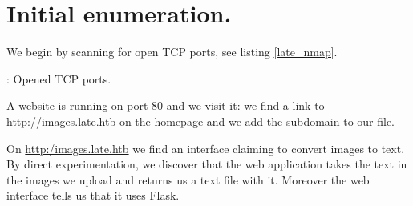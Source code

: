 \section{Initial enumeration.}
\par We begin by scanning  for open TCP ports, see listing \ref{late_nmap}.
\begin{listing}
  \tiny
	
	\caption{: Opened TCP ports.}
	\label{late_nmap}
\end{listing}
\par A website is running on port 80 and we visit it: we find a link to \url{http://images.late.htb} on the homepage and we add the subdomain to our  file.
\par On \url{http:/images.late.htb} we find an interface claiming to convert images to text. By direct experimentation, we discover that the web application takes the text in the images we upload and returns us a text file with it. Moreover the web interface tells us that it uses Flask.
